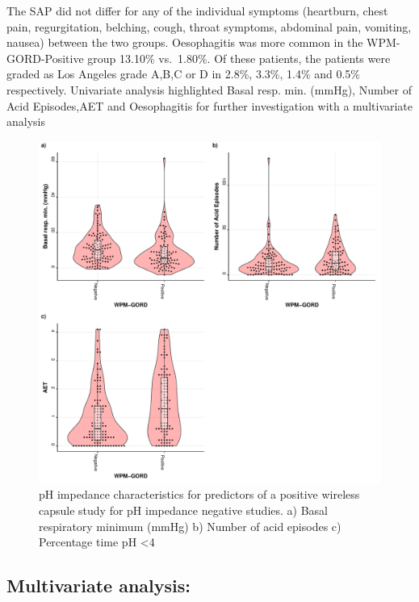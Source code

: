 \documentclass[english,man,floatsintext]{apa6}
\begin{document}
The SAP did not differ for any of the individual symptoms (heartburn, chest pain, regurgitation, belching, cough, throat symptoms, abdominal pain, vomiting, nausea) between the two groups. Oesophagitis was more common in the WPM-GORD-Positive group 13.10\% vs.~1.80\%. Of these patients, the patients were graded as Los Angeles grade A,B,C or D in 2.8\%, 3.3\%, 1.4\% and 0.5\% respectively.
Univariate analysis highlighted Basal resp. min. (mmHg), Number of Acid Episodes,AET and Oesophagitis for further investigation with a multivariate analysis

\pagebreak

\pagebreak

\begin{figure}

\includegraphics{TemplateReport_files/figure-latex/UnivariatePredictorsGraph-1} \hfill{}

\caption{pH impedance characteristics for predictors of a positive wireless capsule study for pH impedance negative studies. a) Basal respiratory minimum (mmHg)  b) Number of acid episodes c) Percentage time pH <4}\label{fig:UnivariatePredictorsGraph}
\end{figure}

\pagebreak

\hypertarget{multivariate-analysis}{%
\subsection{Multivariate analysis:}\label{multivariate-analysis}}
\end{document}

